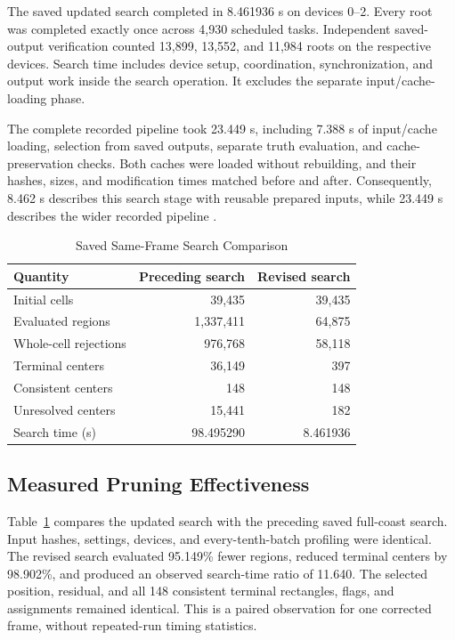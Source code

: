 \documentclass[conference]{IEEEtran}
\begin{document}
The saved updated search completed in 8.461936 s on devices 0--2. Every root was completed exactly once across 4,930 scheduled tasks. Independent saved-output verification counted 13,899, 13,552, and 11,984 roots on the respective devices. Search time includes device setup, coordination, synchronization, and output work inside the search operation. It excludes the separate input/cache-loading phase.

The complete recorded pipeline took 23.449 s, including 7.388 s of input/cache loading, selection from saved outputs, separate truth evaluation, and cache-preservation checks. Both caches were loaded without rebuilding, and their hashes, sizes, and modification times matched before and after. Consequently, 8.462 s describes this search stage with reusable prepared inputs, while 23.449 s describes the wider recorded pipeline \cite{Vaught2026CharlestonRecord}.

\begin{table}[t]
\caption{Saved Same-Frame Search Comparison}
\label{tab:comparison}
\centering
\begin{tabular}{lrr}
\toprule
Quantity & Preceding search & Revised search\\
\midrule
Initial cells & 39,435 & 39,435\\
Evaluated regions & 1,337,411 & 64,875\\
Whole-cell rejections & 976,768 & 58,118\\
Terminal centers & 36,149 & 397\\
Consistent centers & 148 & 148\\
Unresolved centers & 15,441 & 182\\
Search time (s) & 98.495290 & 8.461936\\
\bottomrule
\end{tabular}
\end{table}

\subsection{Measured Pruning Effectiveness}
Table~\ref{tab:comparison} compares the updated search with the preceding saved full-coast search. Input hashes, settings, devices, and every-tenth-batch profiling were identical. The revised search evaluated 95.149\% fewer regions, reduced terminal centers by 98.902\%, and produced an observed search-time ratio of 11.640. The selected position, residual, and all 148 consistent terminal rectangles, flags, and assignments remained identical. This is a paired observation for one corrected frame, without repeated-run timing statistics.
\end{document}

